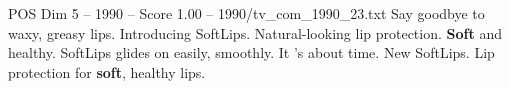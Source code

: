 \begin{textsample}{POS Dim 5 – 1990 – Score 1.00 – 1990/tv\_com\_1990\_23.txt}  \label{ex:f5_pos_025}
Say goodbye to waxy, greasy lips.
Introducing SoftLips.
Natural-looking lip protection. \textbf{Soft} and healthy.
SoftLips glides on easily, smoothly.
It 's about time.
New SoftLips.
Lip protection for \textbf{soft}, healthy lips.

\end{textsample}
